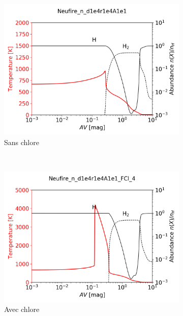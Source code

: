 \begin{figure}[htbp]
    \centering
    \begin{subfigure}[t]{0.45\textwidth} 
        \centering \includegraphics[trim = {0 0 0 1cm},clip,width=1\textwidth]{figure/Cl/neufire/profil_H_noCl.png}
        \caption{Sans chlore}
    \end{subfigure}
    ~ 
    \begin{subfigure}[t]{0.45\textwidth}
        \centering \includegraphics[trim = {0 0cm 0 1cm},clip,width=1\textwidth]{figure/Cl/neufire/profil_H.png}
        \caption{Avec chlore}
    \end{subfigure}
    \caption{}
\end{figure}



